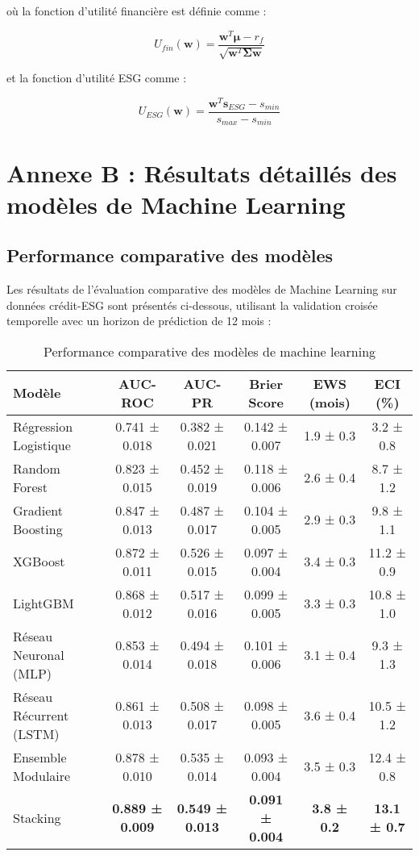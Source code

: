 où la fonction d'utilité financière est définie comme :

\begin{equation}
U_{fin}(\mathbf{w}) = \frac{\mathbf{w}^T \boldsymbol{\mu} - r_f}{\sqrt{\mathbf{w}^T \boldsymbol{\Sigma} \mathbf{w}}}
\end{equation}

et la fonction d'utilité ESG comme :

\begin{equation}
U_{ESG}(\mathbf{w}) = \frac{\mathbf{w}^T \mathbf{s}_{ESG} - s_{min}}{s_{max} - s_{min}}
\end{equation}

\section{Annexe B : Résultats détaillés des modèles de Machine Learning}

\subsection{Performance comparative des modèles}

Les résultats de l'évaluation comparative des modèles de Machine Learning sur données crédit-ESG sont présentés ci-dessous, utilisant la validation croisée temporelle avec un horizon de prédiction de 12 mois :

\begin{table}[h]
\centering
\caption{Performance comparative des modèles de machine learning}
\begin{tabular}{lccccc}
\toprule
\textbf{Modèle} & \textbf{AUC-ROC} & \textbf{AUC-PR} & \textbf{Brier Score} & \textbf{EWS (mois)} & \textbf{ECI (\%)} \\
\midrule
Régression Logistique & 0.741 ± 0.018 & 0.382 ± 0.021 & 0.142 ± 0.007 & 1.9 ± 0.3 & 3.2 ± 0.8 \\
Random Forest & 0.823 ± 0.015 & 0.452 ± 0.019 & 0.118 ± 0.006 & 2.6 ± 0.4 & 8.7 ± 1.2 \\
Gradient Boosting & 0.847 ± 0.013 & 0.487 ± 0.017 & 0.104 ± 0.005 & 2.9 ± 0.3 & 9.8 ± 1.1 \\
XGBoost & 0.872 ± 0.011 & 0.526 ± 0.015 & 0.097 ± 0.004 & 3.4 ± 0.3 & 11.2 ± 0.9 \\
LightGBM & 0.868 ± 0.012 & 0.517 ± 0.016 & 0.099 ± 0.005 & 3.3 ± 0.3 & 10.8 ± 1.0 \\
Réseau Neuronal (MLP) & 0.853 ± 0.014 & 0.494 ± 0.018 & 0.101 ± 0.006 & 3.1 ± 0.4 & 9.3 ± 1.3 \\
Réseau Récurrent (LSTM) & 0.861 ± 0.013 & 0.508 ± 0.017 & 0.098 ± 0.005 & 3.6 ± 0.4 & 10.5 ± 1.2 \\
Ensemble Modulaire & 0.878 ± 0.010 & 0.535 ± 0.014 & 0.093 ± 0.004 & 3.5 ± 0.3 & 12.4 ± 0.8 \\
Stacking & \textbf{0.889 ± 0.009} & \textbf{0.549 ± 0.013} & \textbf{0.091 ± 0.004} & \textbf{3.8 ± 0.2} & \textbf{13.1 ± 0.7} \\
\bottomrule
\end{tabular}
\end{table}

